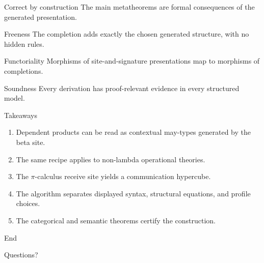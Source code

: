 \documentclass[aspectratio=169,11pt]{beamer}
\begin{document}
\begin{frame}{Correct by construction}
The main metatheorems are formal consequences of the generated presentation.

\vspace{0.5em}
\begin{block}{Freeness}
The completion adds exactly the chosen generated structure, with no hidden rules.
\end{block}

\begin{block}{Functoriality}
Morphisms of site-and-signature presentations map to morphisms of completions.
\end{block}

\begin{block}{Soundness}
Every derivation has proof-relevant evidence in every structured model.
\end{block}
\end{frame}

\begin{frame}{Takeaways}
\begin{enumerate}
  \item Dependent products can be read as contextual may-types generated by the beta site.
  \item The same recipe applies to non-lambda operational theories.
  \item The \(\pi\)-calculus receive site yields a communication hypercube.
  \item The algorithm separates displayed syntax, structural equations, and profile choices.
  \item The categorical and semantic theorems certify the construction.
\end{enumerate}
\end{frame}

\begin{frame}{End}
\begin{center}
\Huge Questions?
\end{center}
\end{frame}
\end{document}
